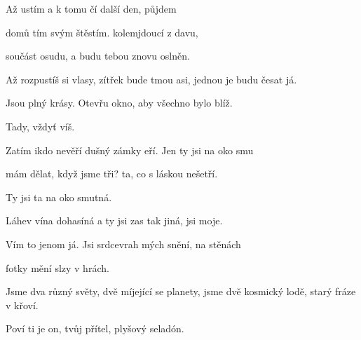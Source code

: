 

\zs
Až ustím  a k tomu
čí další den,  půjdem

 domů  tím svým 
štěstím.  kolemjdoucí z davu,

součást osudu, a budu
tebou znovu oslněn.
\ks

\zs
Až rozpustíš si vlasy, zítřek bude tmou
asi, jednou je budu česat já.

Jsou plný krásy. Otevřu okno,
aby všechno bylo blíž.

Tady, vždyť víš.
\ks


\zr \kr

\zs
Zatím ikdo nevěří dušný zámky
eří. Jen ty jsi na oko smu

 mám dělat, když jsme tři?  ta, co s láskou 
nešetří. 

Ty jsi ta na oko smutná.
\ks

\zs
Láhev vína dohasíná a ty jsi
zas tak jiná, jsi moje.

Vím to jenom já. Jsi srdcevrah
mých snění, na stěnách

fotky mění slzy v hrách.

\ks

\zr \kr

\zs
Jsme dva různý světy, dvě míjející se planety,
jsme dvě kosmický lodě, starý fráze v křoví.

Poví ti je on, tvůj přítel,
plyšový seladón.
\ks


\zr \kr

\kp






